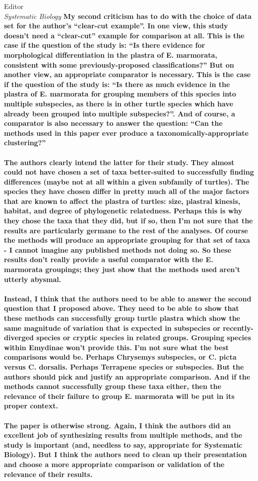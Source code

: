 \documentclass{letter}
\begin{document}
\begin{letter}{Editor \\ \textit{Systematic Biology}}
  \textbf{My second criticism has to do with the choice of data set for the author’s ``clear-cut example''. In one view, this study doesn’t need a ``clear-cut'' example for comparison at all. This is the case if the question of the study is: ``Is there evidence for morphological differentiation in the plastra of E. marmorata, consistent with some previously-proposed classifications?'' But on another view, an appropriate comparator is necessary. This is the case if the question of the study is: ``Is there as much evidence in the plastra of E. marmorata for grouping members of this species into multiple subspecies, as there is in other turtle species which have already been grouped into multiple subspecies?''. And of course, a comparator is also necessary to answer the question: ``Can the methods used in this paper ever produce a taxonomically-appropriate clustering?''\\\\
    The authors clearly intend the latter for their study. They almost could not have chosen a set of taxa better-suited to successfully finding differences (maybe not at all within a given subfamily of turtles). The species they have chosen differ in pretty much all of the major factors that are known to affect the plastra of turtles: size, plastral kinesis, habitat, and degree of phylogenetic relatedness. Perhaps this is why they chose the taxa that they did, but if so, then I’m not sure that the results are particularly germane to the rest of the analyses. Of course the methods will produce an appropriate grouping for that set of taxa - I cannot imagine any published methods not doing so. So these results don’t really provide a useful comparator with the E. marmorata groupings; they just show that the methods used aren’t utterly abysmal. \\\\
    Instead, I think that the authors need to be able to answer the second question that I proposed above. They need to be able to show that these methods can successfully group turtle plastra which show the same magnitude of variation that is expected in subspecies or recently-diverged species or cryptic species in related groups. Grouping species within Emydinae won’t provide this. I’m not sure what the best comparisons would be. Perhaps Chrysemys subspecies, or C. picta versus C. dorsalis. Perhaps Terrapene species or subspecies. But the authors should pick and justify an appropriate comparison. And if the methods cannot successfully group these taxa either, then the relevance of their failure to group E. marmorata will be put in its proper context. \\\\
  The paper is otherwise strong. Again, I think the authors did an excellent job of synthesizing results from multiple methods, and the study is important (and, needless to say, appropriate for Systematic Biology). But I think the authors need to clean up their presentation and choose a more appropriate comparison or validation of the relevance of their results. }


\end{letter}
\end{document}
